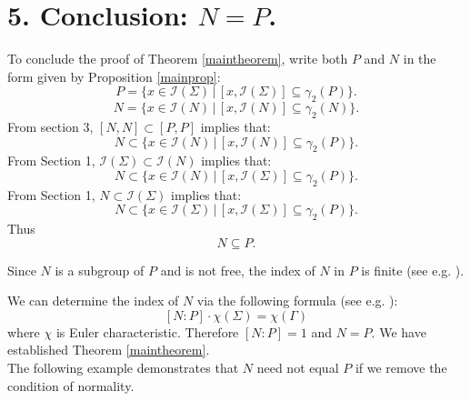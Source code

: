 \documentclass[a4paper]{amsproc}
\theoremstyle{TheoremNum}
\theoremstyle{Theorembold}
\theoremstyle{TheoremboldDef}
\theoremstyle{TheoremboldRem}
\theoremstyle{TheoremboldRem}
\begin{document}
    \section*{5. Conclusion: $N=P$.}
    \addtocounter{section}{1}
    \setcounter{subsection}{0}
     To conclude the proof of Theorem \ref{maintheorem}, write both $P$ and $N$ in the form given by Proposition \ref{mainprop}: \[P=\{x\in {{\mathcal{I}}(\Sigma)}\,|\,[x,{{\mathcal{I}}(\Sigma)}]\subseteq \gamma_2(P)\}.\] \[N=\{x\in {{\mathcal{I}}(N)}\,|\,[x,{{\mathcal{I}}(N)}]\subseteq \gamma_2(N)\}.\] From section 3, $[N,N]\subset [P,P]$ implies that: \[N\subset\{x\in {{\mathcal{I}}(N)}\,|\,[x,{{\mathcal{I}}(N)}]\subseteq \gamma_2(P)\}.\]
          From Section 1, ${{\mathcal{I}}(\Sigma)}\subset{{\mathcal{I}}(N)}$ implies that: \[N\subset\{x\in {{\mathcal{I}}(N)}\,|\,[x,{{\mathcal{I}}(\Sigma)}]\subseteq \gamma_2(P)\}.\]
          From Section 1, $N\subset {{\mathcal{I}}(\Sigma)}$ implies that: \[N\subset\{x\in {{\mathcal{I}}(\Sigma)}\,|\,[x,{{\mathcal{I}}(\Sigma)}]\subseteq \gamma_2(P)\}.\]
          Thus \[N\subseteq P.\]
          
          Since $N$ is a subgroup of $P$ and is not free, the index of $N$ in $P$ is finite (see e.g. \cite[Th.1]{jaco}).
          
          We can determine the index of $N$ via the following formula (see e.g. \cite[Sect.2.2 Ex.22]{hatcher}):  \[[N:P]\cdot \chi (\Sigma)=\chi(\Gamma)\] where $\chi$ is Euler characteristic. 
          Therefore $[N:P]=1$ and $N=P$. We have established Theorem \ref{maintheorem}.\\
    
    The following example demonstrates that $N$ need not equal $P$ if we remove the condition of normality. 
\end{document}
